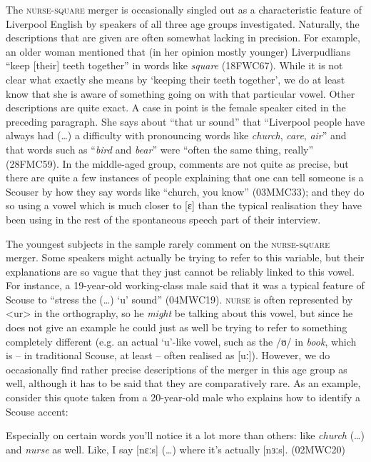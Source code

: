The \textsc{nurse}-\textsc{square} merger is occasionally singled out as a characteristic feature of Liverpool English by speakers of all three age groups investigated.
Naturally, the descriptions that are given are often somewhat lacking in precision.
For example, an older woman mentioned that (in her opinion mostly younger) Liverpudlians ``keep [their] teeth together'' in words like \emph{square} (18FWC67).
While it is not clear what exactly she means by `keeping their teeth together', we do at least know that she is aware of something going on with that particular vowel.
Other descriptions are quite exact.
A case in point is the female speaker cited in the preceding paragraph.
She says about ``that ur sound'' that  ``Liverpool people have always had (\ldots) a difficulty with pronouncing words like \emph{church}, \emph{care}, \emph{air}'' and that words such as ``\emph{bird} and \emph{bear}'' were ``often the same thing, really'' (28FMC59).
In the middle-aged group, comments are not quite as precise, but there are quite a few instances of people explaining that one can tell someone is a Scouser by how they say words like ``church, you know'' (03MMC33); and they do so using a vowel which is much closer to [ɛ] than the typical realisation they have been using in the rest of the spontaneous speech part of their interview.

The youngest subjects in the sample rarely comment on the \textsc{nurse}-\textsc{square} merger.
Some speakers might actually be trying to refer to this variable, but their explanations are so vague that they just cannot be reliably linked to this vowel.
For instance, a 19-year-old working-class male said that it was a typical feature of Scouse to ``stress the (\ldots) `u' sound'' (04MWC19).
\textsc{nurse} is often represented by <ur> in the orthography, so he \emph{might} be talking about this vowel, but since he does not give an example he could just as well be trying to refer to something completely different (e.g. an actual `u'-like vowel, such as the /ʊ/ in \emph{book}, which is -- in traditional Scouse, at least -- often realised as [uː]).
However, we do occasionally find rather precise descriptions of the merger in this age group as well, although it has to be said that they are comparatively rare.
As an example, consider this quote taken from a 20-year-old male who explains how to identify a Scouse accent:
\begin{example}
	Especially on certain words you'll notice it a lot more than others: like \emph{church} (\ldots) and \emph{nurse} as well.
	Like, I say [nɛːs] (\ldots) where it's actually [nɜːs]. (02MWC20)
\end{example}

